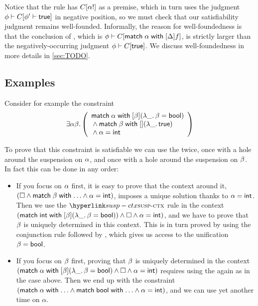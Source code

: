 \documentclass[acmsmall,screen,nonacm]{acmart}
\begin{document}
Notice that the rule  has $C[\alpha!]$ as a premise, which in
turn uses the judgment $\phi \vdash C[\phi' \vdash \mathsf{true}]$ in
negative position, so we must check that our satisfiability judgment remains
well-founded. Informally, the reason for well-foundedness is that the
conclusion of , which is $\phi \vdash C[\mathopen{}\mathrel{\mathsf{match}} \alpha \mathrel{\mathsf{with}} [ \Delta ] f]$, is strictly larger than the negatively-occurring judgment
$\phi \vdash C[\mathsf{true}]$. We discuss well-foundedness in more details in
\cref{sec:TODO}.

\subsection{Examples}

Consider for example the constraint
$$
  \exists \alpha \beta.
  \left(\begin{array}{l}
    \mathopen{}\mathrel{\mathsf{match}} \alpha \mathrel{\mathsf{with}} [ \beta ] (\lambda {{\_}}. \,{\beta = \mathsf{bool}}) \\
    {} \wedge \mathopen{}\mathrel{\mathsf{match}} \beta \mathrel{\mathsf{with}} [  ] (\lambda {{\_}}. \,{\mathsf{true}}) \\
    {} \wedge \alpha = \mathsf{int}
  \end{array}\right)
$$

To prove that this constraint is satisfiable we can use the 
twice, once with a hole around the suspension on $\alpha$, and once with a
hole around the suspension on $\beta$. In fact this can be done in any order:
\begin{itemize}
\item
  If you focus on $\alpha$ first, it is easy to prove that the context around
  it, $(\square \cand \cmatchdots \tvb \cand \tva = \tint)$, imposes a
  unique solution thanks to $\alpha = \mathsf{int}$. Then we use the
  $\Rule{susp-ctx}$ rule in the context $(\mathopen{}\mathrel{\mathsf{match}} \mathsf{int} \mathrel{\mathsf{with}} [ \beta ] (\lambda {{\_}}. \,{\beta = \mathsf{bool}})) \wedge \square \wedge \alpha = \mathsf{int})$, and we have
  to prove that $\beta$ is uniquely determined in this context. This is in
  turn proved by using the conjunction rule followed by ,
  which gives us access to the unification $\beta = \mathsf{bool}$.

\item
  If you focus on $\beta$ first, proving that $\beta$ is uniquely determined
  in the context $(\mathopen{}\mathrel{\mathsf{match}} \alpha \mathrel{\mathsf{with}} [ \beta ] (\lambda {{\_}}. \,{\beta = \mathsf{bool}}) \wedge
  \square \wedge \alpha = \mathsf{int})$ requires using the  again as
  in the case above. Then we end up with the constraint $(\cmatchdots \tva
  \cand \cmatchdots \tbool \cand \tva = \tint)$, and we can use
   yet another time on $\alpha$.

\end{itemize}
\end{document}
